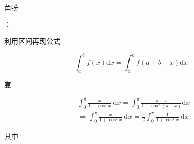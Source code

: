 \documentclass[10pt]{article}
\begin{document}
\begin{CJK}{UTF8}{mj}角㸮\end{CJK}：\begin{CJK}{UTF8}{mj}利用区间再现公式\end{CJK}
$$
\int_{a}^{b} f(x) \mathrm{d} x=\int_{a}^{b} f(a+b-x) \mathrm{d} x
$$
\begin{CJK}{UTF8}{mj}㕝\end{CJK}
$$
\begin{aligned}
&\int_{0}^{\pi} \frac{x}{1+\cos ^{2} x} \mathrm{~d} x=\int_{0}^{\pi} \frac{\pi-x}{1+\cos ^{2}(\pi-x)} \mathrm{d} x \\
&\Rightarrow \int_{0}^{\pi} \frac{x}{1+\cos ^{2} x} \mathrm{~d} x=\frac{\pi}{2} \int_{0}^{\pi} \frac{1}{1+\cos ^{2} x} \mathrm{~d} x
\end{aligned}
$$
\begin{CJK}{UTF8}{mj}其中\end{CJK}
\end{document}
